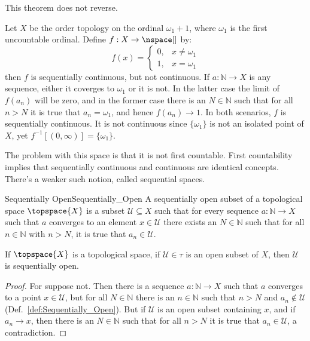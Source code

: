         This theorem does not reverse.
        \begin{example}
            Let $X$ be the order topology on the ordinal $\omega_{1}+1$, where
            $\omega_{1}$ is the first uncountable ordinal. Define
            $f:X\rightarrow\nspace[]$ by:
            \begin{equation}
                f(x)=
                \begin{cases}
                    0,&x\ne\omega_{1}\\
                    1,&x=\omega_{1}
                \end{cases}
            \end{equation}
            then $f$ is sequentially continuous, but not continuous. If
            $a:\mathbb{N}\rightarrow{X}$ is any sequence, either it coverges to
            $\omega_{1}$ or it is not. In the latter case the limit of
            $f(a_{n})$ will be zero, and in the former case there is an
            $N\in\mathbb{N}$ such that for all $n>N$ it is true that
            $a_{n}=\omega_{1}$, and hence $f(a_{n})\rightarrow{1}$. In both
            scenarios, $f$ is sequentially continuous. It is not continuous
            since $\{\omega_{1}\}$ is not an isolated point of $X$, yet
            $f^{\minus{1}}[(0,\infty)]=\{\omega_{1}\}$.
        \end{example}
        The problem with this space is that it is not first countable. First
        countability implies that sequentially continuous and continuous are
        identical concepts. There's a weaker such notion, called sequential
        spaces.
        \begin{fdefinition}{Sequentially Open}{Sequentially_Open}
            A sequentially open subset of a topological space $\topspace{X}$
            is a subset $\mathcal{U}\subseteq{X}$ such that for every sequence
            $a:\mathbb{N}\rightarrow{X}$ such that $a$ converges to an element
            $x\in\mathcal{U}$ there exists an $N\in\mathbb{N}$ such that for all
            $n\in\mathbb{N}$ with $n>N$, it is true that $a_{n}\in\mathcal{U}$.
        \end{fdefinition}
        \begin{theorem}
            \label{thm:Open_is_Seq_Open}%
            If $\topspace{X}$ is a topological space, if $\mathcal{U}\in\tau$ is
            an open subset of $X$, then $\mathcal{U}$ is sequentially open.
        \end{theorem}
        \begin{proof}
            For suppose not. Then there is a sequence
            $a:\mathbb{N}\rightarrow{X}$ such that $a$ converges to a point
            $x\in\mathcal{U}$, but for all $N\in\mathbb{N}$ there is an
            $n\in\mathbb{N}$ such that $n>N$ and $a_{n}\notin\mathcal{U}$
            (Def.~\ref{def:Sequentially_Open}). But if $\mathcal{U}$ is an open
            subset containing $x$, and if $a_{n}\rightarrow{x}$, then there is
            an $N\in\mathbb{N}$ such that for all $n>N$ it is true that
            $a_{n}\in\mathcal{U}$, a contradiction.
        \end{proof}
